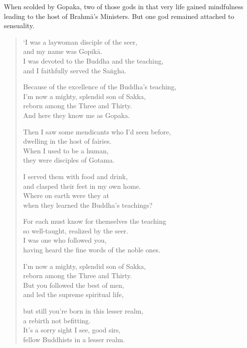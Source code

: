 \documentclass[12pt,openany]{book}%
\begin{document}
When scolded by Gopaka, two of those gods in that very life gained mindfulness leading to the host of \textsanskrit{Brahmā}’s Ministers. But one god remained attached to sensuality. 

\begin{verse}%
‘I was a laywoman disciple of the seer, \\
and my name was \textsanskrit{Gopikā}. \\
I was devoted to the Buddha and the teaching, \\
and I faithfully served the \textsanskrit{Saṅgha}. 

Because of the excellence of the Buddha’s teaching, \\
I’m now a mighty, splendid son of Sakka, \\
reborn among the Three and Thirty. \\
And here they know me as Gopaka. 

Then I saw some mendicants who I’d seen before, \\
dwelling in the host of fairies. \\
When I used to be a human, \\
they were disciples of Gotama. 

I served them with food and drink, \\
and clasped their feet in my own home. \\
Where on earth were they at \\
when they learned the Buddha’s teachings? 

For each must know for themselves the teaching \\
so well-taught, realized by the seer. \\
I was one who followed you, \\
having heard the fine words of the noble ones. 

I’m now a mighty, splendid son of Sakka, \\
reborn among the Three and Thirty. \\
But you followed the best of men, \\
and led the supreme spiritual life, 

but still you’re born in this lesser realm, \\
a rebirth not befitting. \\
It’s a sorry sight I see, good sirs, \\
fellow Buddhists in a lesser realm. 


\end{verse}
\end{document}

